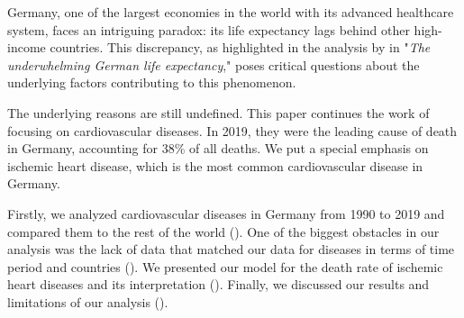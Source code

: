 
Germany, one of the largest economies in the world with its advanced healthcare 
system, faces an intriguing paradox: its life expectancy lags behind other 
high-income countries. This discrepancy, as highlighted in the analysis by 
\citet{Jasilionis2023} in "\textit{The underwhelming German life expectancy}," 
poses critical questions about the underlying factors contributing to this 
phenomenon.

The underlying reasons are still undefined. This paper continues the work of \citet{Jasilionis2023} focusing on cardiovascular diseases. In 2019, they were the leading cause of death in Germany, accounting for 38\% of all deaths. 
We put a special emphasis on ischemic heart disease, which is the most common cardiovascular disease in Germany.


Firstly, we analyzed cardiovascular diseases in Germany from 1990 to 2019 and compared them to the rest of the world (). One of the biggest obstacles in our analysis was the lack of data that matched our data for diseases in terms of time period and countries (). We presented our model for the death rate of ischemic heart diseases and its interpretation (). Finally, we discussed our results and limitations of our analysis ().
